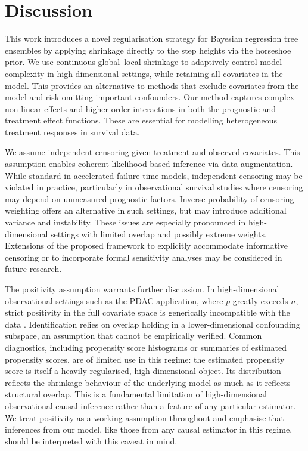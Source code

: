 \section{Discussion}\label{section:Discussion}

This work introduces a novel regularisation strategy for Bayesian regression tree ensembles by applying shrinkage directly to the step heights via the horseshoe prior. 
We use continuous global--local shrinkage to adaptively control model complexity in high-dimensional settings, while retaining all covariates in the model. 
This provides an alternative to methods that exclude covariates from the model and risk omitting important confounders.
Our method captures complex non-linear effects and higher-order interactions in both the prognostic and treatment effect functions. 
These are essential for modelling heterogeneous treatment responses in survival data.


We assume independent censoring given treatment and observed covariates. 
This assumption enables coherent likelihood-based inference via data augmentation. 
While standard in accelerated failure time models, independent censoring may be violated in practice, particularly in observational survival studies where censoring may depend on unmeasured prognostic factors. 
Inverse probability of censoring weighting \citep{RobinsFinkelstein2000} offers an alternative in such settings, but may introduce additional variance and instability. 
These issues are especially pronounced in high-dimensional settings with limited overlap and possibly extreme weights. 
Extensions of the proposed framework to explicitly accommodate informative censoring or to incorporate formal sensitivity analyses may be considered in future research.


The positivity assumption warrants further discussion.
In high-dimensional observational settings such as the PDAC application, where $p$ greatly exceeds $n$, strict positivity in the full covariate space is generically incompatible with the data \citep{DAmour2021Overlap}. 
Identification relies on overlap holding in a lower-dimensional confounding subspace, an assumption that cannot be empirically verified. 
Common diagnostics, including propensity score histograms or summaries of estimated propensity scores, are of limited use in this regime: the estimated propensity score is itself a heavily regularised, high-dimensional object.
Its distribution reflects the shrinkage behaviour of the underlying model as much as it reflects structural overlap. 
This is a fundamental limitation of high-dimensional observational causal inference rather than a feature of any particular estimator. 
We treat positivity as a working assumption throughout and emphasise that inferences from our model, like those from any causal estimator in this regime, should be interpreted with this caveat in mind.


